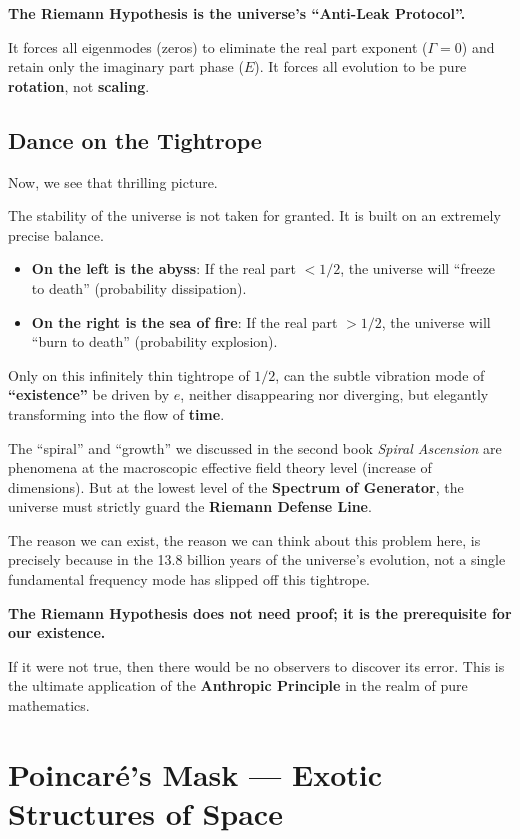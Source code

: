 \documentclass[11pt,a4paper,twoside]{book}
\begin{document}
\textbf{The Riemann Hypothesis is the universe's ``Anti-Leak Protocol''.}

It forces all eigenmodes (zeros) to eliminate the real part exponent ($\Gamma=0$) and retain only the imaginary part phase ($E$). It forces all evolution to be pure \textbf{rotation}, not \textbf{scaling}.

\subsection{Dance on the Tightrope}

Now, we see that thrilling picture.

The stability of the universe is not taken for granted. It is built on an extremely precise balance.

\begin{itemize}
\item \textbf{On the left is the abyss}: If the real part $< 1/2$, the universe will ``freeze to death'' (probability dissipation).

\item \textbf{On the right is the sea of fire}: If the real part $> 1/2$, the universe will ``burn to death'' (probability explosion).
\end{itemize}

Only on this infinitely thin tightrope of \textbf{$1/2$}, can the subtle vibration mode of \textbf{``existence''} be driven by $e$, neither disappearing nor diverging, but elegantly transforming into the flow of \textbf{time}.

The ``spiral'' and ``growth'' we discussed in the second book \emph{Spiral Ascension} are phenomena at the macroscopic effective field theory level (increase of dimensions). But at the lowest level of the \textbf{Spectrum of Generator}, the universe must strictly guard the \textbf{Riemann Defense Line}.

The reason we can exist, the reason we can think about this problem here, is precisely because in the 13.8 billion years of the universe's evolution, not a single fundamental frequency mode has slipped off this tightrope.

\textbf{The Riemann Hypothesis does not need proof; it is the prerequisite for our existence.}

If it were not true, then there would be no observers to discover its error. This is the ultimate application of the \textbf{Anthropic Principle} in the realm of pure mathematics.

\section{Poincaré's Mask — Exotic Structures of Space}
\end{document}
